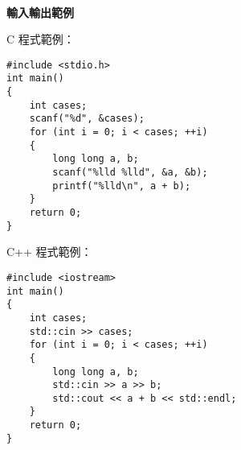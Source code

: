 \begin{center}
    \LARGE \bf
    \NPSCYear \ContestName\\
    輸入輸出範例
\end{center}


C 程式範例：
\begin{lstlisting}[frame=single]
#include <stdio.h>
int main()
{
    int cases;
    scanf("%d", &cases);
    for (int i = 0; i < cases; ++i)
    {
        long long a, b;
        scanf("%lld %lld", &a, &b);
        printf("%lld\n", a + b);
    }
    return 0;
}
\end{lstlisting}

C++ 程式範例：
\begin{lstlisting}[frame=single]
#include <iostream>
int main()
{
    int cases;
    std::cin >> cases;
    for (int i = 0; i < cases; ++i)
    {
        long long a, b;
        std::cin >> a >> b;
        std::cout << a + b << std::endl;
    }
    return 0;
}
\end{lstlisting}

\clearpage

\clearpage
